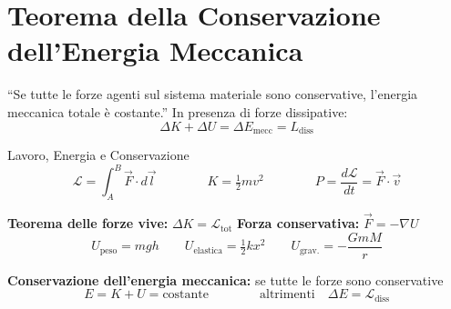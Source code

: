 \section{Teorema della Conservazione dell'Energia Meccanica}
``Se tutte le forze agenti sul sistema materiale sono conservative, l'energia meccanica totale è costante.''
In presenza di forze dissipative:
\begin{equation}
    \Delta K + \Delta U = \Delta E_{\text{mecc}} = L_{\text{diss}}
\end{equation}

\begin{formulario}{Lavoro, Energia e Conservazione}
\begin{equation*}
    \mathcal{L} = \int_A^B \vec{F} \cdot d\vec{l}
    \qquad\qquad
    K = \tfrac{1}{2} m v^2
    \qquad\qquad
    P = \frac{d\mathcal{L}}{dt} = \vec{F} \cdot \vec{v}
\end{equation*}

\textbf{Teorema delle forze vive:} \; $\Delta K = \mathcal{L}_{\text{tot}}$
\qquad
\textbf{Forza conservativa:} \; $\vec{F} = -\nabla U$
\begin{equation*}
    U_{\text{peso}} = mgh
    \qquad
    U_{\text{elastica}} = \tfrac{1}{2} k x^2
    \qquad
    U_{\text{grav.}} = -\frac{GmM}{r}
\end{equation*}

\textbf{Conservazione dell'energia meccanica:} se tutte le forze sono conservative
\begin{equation*}
    E = K + U = \text{costante}
    \qquad\qquad
    \text{altrimenti} \quad \Delta E = \mathcal{L}_{\text{diss}}
\end{equation*}
\end{formulario}

